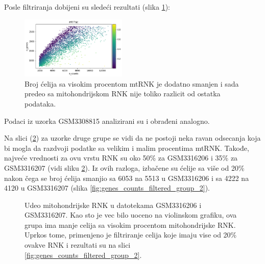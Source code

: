 \documentclass{article}
\begin{document}
Posle filtriranja dobijeni su sledeći rezultati (slika \ref{fig:n_counts_after_filtering_genes}):  

\begin{figure}[H]
    \centering
    \includegraphics[width=0.45\textwidth]{GSM3308814-genes-counts-filtered2.png}
    \caption{ Broj ćelija sa visokim procentom mtRNK je dodatno smanjen i sada predeo sa mitohondrijskom RNK nije toliko razlicit od ostatka podataka. }
    \label{fig:n_counts_after_filtering_genes}
\end{figure}

Podaci iz uzorka GSM3308815 analizirani su i obrađeni analogno.

Na slici (\ref{fig:genes_counts_group_2}) za uzorke druge grupe se vidi da ne postoji neka ravan odsecanja koja bi mogla da razdvoji podatke sa velikim i malim procentima mtRNK. Takođe, najveće vrednosti za ovu vrstu RNK su oko 50\% za GSM3316206 i 35\% za GSM3316207 (vidi sliku \ref{fig:genes_counts_group_2}). Iz ovih razloga, izbačene su ćelije sa više od 20\% nakon čega se broj ćelija smanjio sa 6053 na 5513 u GSM3316206 i sa 4222 na 4120 u GSM3316207 (slika \ref{fig:genes_counts_filtered_group_2}).

\begin{figure}[H]
    \centering
    \caption{ Udeo mitohondrijske RNK u datotekama GSM3316206 i GSM3316207. Kao sto je vec bilo uoceno na violinskom grafiku, ova grupa ima manje celija sa visokim procentom mitohondrijske RNK. Uprkos tome, primenjeno je filtriranje celija koje imaju vise od 20\% ovakve RNK i rezultati su na slici \ref{fig:genes_counts_filtered_group_2}. }
    \label{fig:genes_counts_group_2}
\end{figure}
\end{document}
